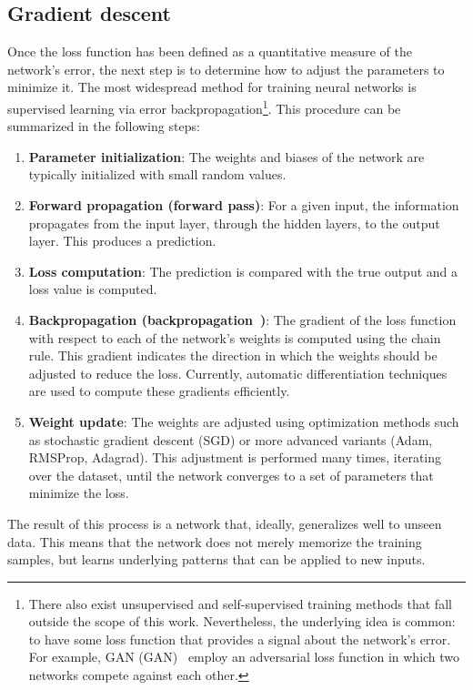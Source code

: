 \subsection{Gradient descent}\label{subsec:descenso_gradiente}

Once the loss function has been defined as a quantitative measure of the network's error, the next step is to determine how to adjust the parameters to minimize it. The most widespread method for training neural networks is supervised learning via error backpropagation\footnote{There also exist unsupervised and self-supervised training methods that fall outside the scope of this work. Nevertheless, the underlying idea is common: to have some loss function that provides a signal about the network's error. For example, \acrlong{GAN} (\gls{GAN})~\citep{goodfellow2014generative} employ an adversarial loss function in which two networks compete against each other.}. This procedure can be summarized in the following steps:

\begin{enumerate}
	\item \textbf{Parameter initialization}: The weights and biases of the network are typically initialized with small random values.
	\item \textbf{Forward propagation (forward pass)}: For a given input, the information propagates from the input layer, through the hidden layers, to the output layer. This produces a prediction.
	\item \textbf{Loss computation}: The prediction is compared with the true output and a loss value is computed.
	\item \textbf{Backpropagation (backpropagation~\citep{backpropagation})}: The gradient of the loss function with respect to each of the network's weights is computed using the chain rule. This gradient indicates the direction in which the weights should be adjusted to reduce the loss. Currently, automatic differentiation techniques~\citep{Neidinger2010IntroductionTA} are used to compute these gradients efficiently.
	\item \textbf{Weight update}: The weights are adjusted using optimization methods such as stochastic gradient descent (\gls{SGD}) or more advanced variants (\gls{Adam}, RMSProp, Adagrad). This adjustment is performed many times, iterating over the dataset, until the network converges to a set of parameters that minimize the loss.
\end{enumerate}

The result of this process is a network that, ideally, generalizes well to unseen data. This means that the network does not merely memorize the training samples, but learns underlying patterns that can be applied to new inputs.

